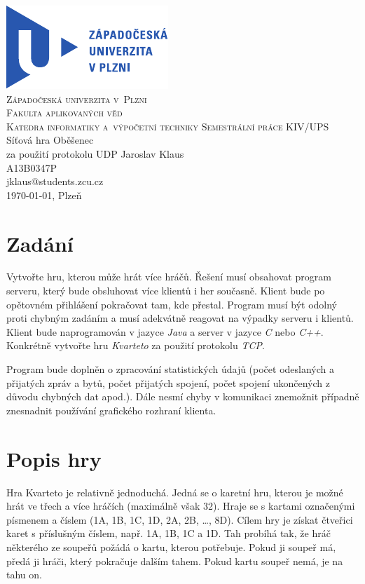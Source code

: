 \documentclass[12pt, a4paper]{article}
\begin{document}
	\begin{titlepage}
		\begin{center}
			\includegraphics{img/ZCULogo.pdf}\\[1cm]
			\textsc{\LARGE Západočeská univerzita v~Plzni}\\[0.1cm]
			\textsc{\Large Fakulta aplikovaných věd}\\[0.1cm]
			\textsc{\large Katedra informatiky a~výpočetní techniky}
			\vfill
			\textsc{\LARGE Semestrální práce KIV/UPS}\\[0.2cm]
			\Large{Síťová hra Oběšenec\\za použití protokolu UDP}
			\vfill
			Jaroslav Klaus\\
			A13B0347P\\
			jklaus@students.zcu.cz\\[0.2cm]
			\today, Plzeň
		\end{center}
	\end{titlepage}

	\tableofcontents
	\newpage

	\section{Zadání}
	Vytvořte hru, kterou může hrát více hráčů. Řešení musí obsahovat program serveru, který bude obsluhovat více klientů i her současně. Klient bude po opětovném přihlášení pokračovat tam, kde přestal. Program musí být odolný proti chybným zadáním a musí adekvátně reagovat na výpadky serveru i klientů. Klient bude naprogramován v jazyce \emph{Java} a server v jazyce \emph{C} nebo \emph{C++}. Konkrétně vytvořte hru \emph{Kvarteto} za použití protokolu \emph{TCP}.
	
	Program bude doplněn o zpracování statistických údajů (počet odeslaných a přijatých zpráv a bytů, počet přijatých spojení, počet spojení ukončených z důvodu chybných dat apod.). Dále nesmí chyby v komunikaci znemožnit případně znesnadnit používání grafického rozhraní klienta.
	
	\section{Popis hry}
	Hra Kvarteto je relativně jednoduchá. Jedná se o karetní hru, kterou je možné hrát ve třech a více hráčích (maximálně však 32). Hraje se s kartami označenými písmenem a číslem (1A, 1B, 1C, 1D, 2A, 2B, \dots, 8D). Cílem hry je získat čtveřici karet s příslušným číslem, např. 1A, 1B, 1C a 1D. Tah probíhá tak, že hráč některého ze soupeřů požádá o kartu, kterou potřebuje. Pokud ji soupeř má, předá ji hráči, který pokračuje dalším tahem. Pokud kartu soupeř nemá, je na tahu on.
	
\end{document}
